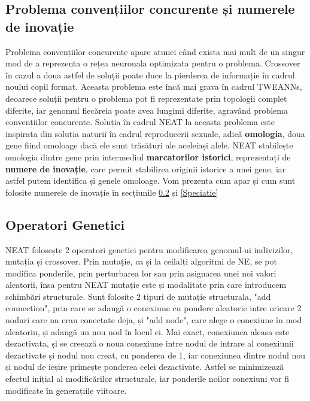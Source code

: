 \subsection{Problema convențiilor concurente și numerele de inovație}\label{Numar de inovatie}
Problema convențiilor concurente apare atunci când exista mai mult de un singur mod de a reprezenta o rețea neuronala optimizata pentru o problema.
Crossover în cazul a doua astfel de soluții poate duce la pierderea de informație în cadrul noului copil format.
Aceasta problema este încă mai grava în cadrul TWEANNs, deoarece soluții pentru o problema pot fi reprezentate prin topologii complet diferite, iar genomul fiecăreia poate avea lungimi diferite, agravând problema convențiilor concurente. 
Soluția în cadrul NEAT la aceasta problema este inspirata din soluția naturii în cadrul reproducerii sexuale, adică \textbf{omologia}, doua gene fiind omoloage dacă ele sunt trăsături ale aceleiași alele.
NEAT stabilește omologia dintre gene prin intermediul \textbf{marcatorilor istorici}, reprezentați de \textbf{numere de inovație}, care permit stabilirea originii istorice a unei gene, iar astfel putem identifica și genele omoloage.
Vom prezenta cum apar și cum sunt folosite numerele de inovație în secțiunile \ref*{OperatoriGenetici} și \ref*{Speciatie}

\subsection{Operatori Genetici}\label{OperatoriGenetici}
NEAT folosește 2 operatori genetici pentru modificarea genomul-ui indivizilor, mutația și crossover.
Prin mutație, ca și la ceilalți algoritmi de NE, se pot modifica ponderile, prin perturbarea lor sau prin asignarea unei noi valori aleatorii, însa pentru NEAT mutație este și modalitate prin care introducem schimbări structurale.
Sunt folosite 2 tipuri de mutație structurala, "add connection", prin care se adaugă o conexiune cu pondere aleatorie intre oricare 2 noduri care nu erau conectate deja, și "add node", care alege o conexiune în mod aleatoriu, și adaugă un nou nod în locul ei.
Mai exact, conexiunea aleasa este dezactivata, și se creează o noua conexiune intre nodul de intrare al conexiunii dezactivate și nodul nou creat, cu ponderea de 1, iar conexiunea dintre nodul nou și nodul de ieșire primește ponderea celei dezactivate.
Astfel se minimizează efectul inițial al modificărilor structurale, iar ponderile noilor conexiuni vor fi modificate în generațiile viitoare.

